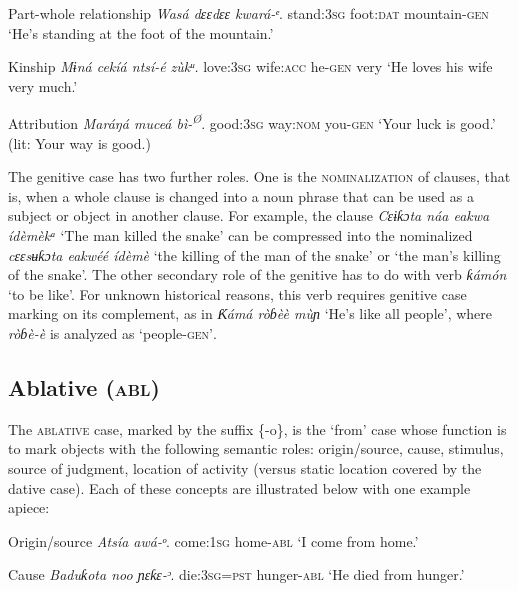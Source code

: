 Part-whole relationship
\textit{Wasá     dɛɛdɛɛ   kwará-}\textit{ᵉ}.
stand:\textsc{3sg}   foot:\textsc{dat}   mountain-\textsc{gen}
‘He’s standing at the foot of the mountain.’




Kinship
\textit{Mɨná     cekíá     ntsí-}\textit{é}\textit{     zùkᵘ.}
love:\textsc{3sg}   wife:\textsc{acc}   he-\textsc{gen}   very
‘He loves his wife very much.’




Attribution
\textit{Maráŋá   muceá   bì-}\textit{\textsuperscript{Ø}}.
good:\textsc{3sg}   way:\textsc{nom}   you-\textsc{gen}
‘Your luck is good.’ (lit: Your way is good.)


The genitive case has two further roles. One is the \textsc{nominalization} of clauses, that is, when a whole clause is changed into a noun phrase that can be used as a subject or object in another clause. For example, the clause \textit{Cɛɨƙɔta náa eakwa ídèmèkᵃ} ‘The man killed the snake’ can be compressed into the nominalized \textit{cɛɛsʉƙɔta eakwéé ídèmè} ‘the killing of the man of the snake’ or ‘the man’s killing of the snake’. The other secondary role of the genitive has to do with verb \textit{ƙámón} ‘to be like’. For unknown historical reasons, this verb requires genitive case marking on its complement, as in \textit{Ƙámá ròɓèè mùɲ} ‘He’s like all people’, where \textit{ròɓè-è} is analyzed as ‘people-\textsc{gen’}.





\subsection{Ablative (\textsc{abl})}


The \textsc{ablative} case, marked by the suffix \{-o\}, is the ‘from’ case whose function is to mark objects with the following semantic roles: origin/source, cause, stimulus, source of judgment, location of activity (versus static location covered by the dative case). Each of these concepts are illustrated below with one example apiece:




Origin/source
\textit{Atsía     awá-}\textit{ᵒ}.
come:\textsc{1sg}   home-\textsc{abl}
‘I come from home.’




Cause
\textit{Baduƙota noo   ɲɛƙɛ{}-}\textit{ᵓ}.
die:\textsc{3sg}=\textsc{pst}     hunger-\textsc{abl}
‘He died from hunger.’




